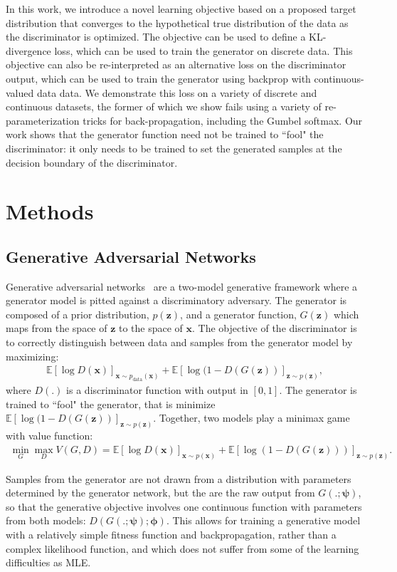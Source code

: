 \documentclass[10pt]{article}
\newcommand{\vect}[1]{\mathbf{#1}}
\newcommand{\vects}[1]{\boldsymbol{#1}}
\newcommand{\vx}[0]{\vect{x}}
\newcommand{\vz}[0]{\vect{z}}
\newcommand{\PP}[0]{\vects{\phi}}
\newcommand{\PS}[0]{\vects{\psi}}
\begin{document}
In this work, we introduce a novel learning objective based on a proposed target distribution that converges to the hypothetical true distribution of the data as the discriminator is optimized.
The objective can be used to define a KL-divergence loss, which can be used to train the generator on discrete data.
This objective can also be re-interpreted as an alternative loss on the discriminator output, which can be used to train the generator using backprop with continuous-valued data data.
We demonstrate this loss on a variety of discrete and continuous datasets, the former of which we show fails using a variety of re-parameterization tricks for back-propagation, including the Gumbel softmax.
Our work shows that the generator function need not be trained to ``fool" the discriminator: it only needs to be trained to set the generated samples at the decision boundary of the discriminator.

\section{Methods}
\subsection{Generative Adversarial Networks}
Generative adversarial networks~\citep[GANs, ][]{goodfellow2014generative} are a two-model generative framework where a generator model is pitted against a discriminatory adversary.
The generator is composed of a prior distribution, $p(\vz)$, and a generator function, $G(\vz)$ which maps from the space of $\vz$ to the space of $\vx$.
The objective of the discriminator is to correctly distinguish between data and samples from the generator model by maximizing:
\begin{align}
\mathbb{E} \left[\log D(\vx) \right]_{\vx \sim p_{\text{data}}(\vx)} + \mathbb{E} \left[ \log(1 - D(G(\vz)) \right]_{\vz \sim p(\vz)},
\label{eq:gan}
\end{align}
where $D(.)$ is a discriminator function with output in $[0, 1]$.
The generator is trained to ``fool" the generator, that is minimize $\mathbb{E} \left[ \log(1 - D(G(\vz)) \right]_{\vz \sim p(\vz)}$.
Together, two models play a minimax game with value function:
\begin{align}
\min_G \max_D V(G, D) = \mathbb{E}[\log D(\vx)]_{\vx \sim p(\vx)} + \mathbb{E}[\log (1 - D(G(\vz)))]_{\vz \sim p(\vz)}.
\label{eq:minmax}
\end{align}

Samples from the generator are not drawn from a distribution with parameters determined by the generator network, but the are the raw output from $G(.;\PS)$, so that the generative objective involves one continuous function with parameters from both models: $D(G(.;\PS);\PP)$.
This allows for training a generative model with a relatively simple fitness function and backpropagation, rather than a complex likelihood function, and which does not suffer from some of the learning difficulties as MLE.
\end{document}
